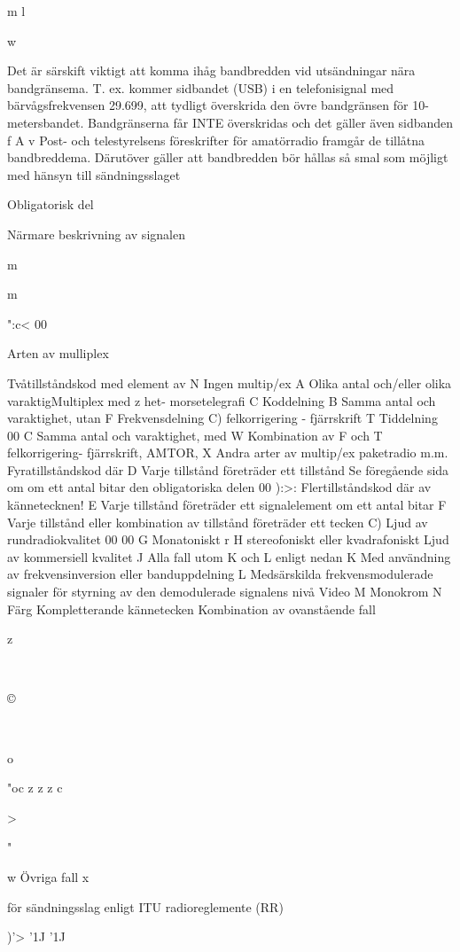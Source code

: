 m
l

w

Det är särskift viktigt att komma ihåg bandbredden vid utsändningar nära bandgränsema. T. ex.
kommer sidbandet (USB) i en telefonisignal med
bärvågsfrekvensen 29.699, att tydligt överskrida
den övre bandgränsen för 10-metersbandet. Bandgränserna får INTE överskridas och det gäller även
sidbanden f
A v Post- och telestyrelsens föreskrifter för amatörradio framgår de tillåtna bandbreddema. Därutöver gäller att bandbredden bör hållas så smal som
möjligt med hänsyn till sändningsslaget

Obligatorisk del

Närmare beskrivning av signalen

m

m

":c<
00

Arten av mulliplex

Tvåtillståndskod med element av
N Ingen multip/ex
A Olika antal och/eller olika varaktigMultiplex med
z
het- morsetelegrafi
C Koddelning
B Samma antal och varaktighet, utan
F Frekvensdelning
C)
felkorrigering - fjärrskrift
T Tiddelning
00
C Samma antal och varaktighet, med
W Kombination av F och T
felkorrigering- fjärrskrift, AMTOR,
X Andra arter av multip/ex
paketradio m.m.
Fyratillståndskod där
D Varje tillstånd företräder ett tillstånd
Se föregående sida om
om ett antal bitar
den obligatoriska delen
00
):>:
Flertillståndskod där
av kännetecknen!
E Varje tillstånd företräder ett signalelement om ett antal bitar
F Varje tillstånd eller kombination av
tillstånd företräder ett tecken
C)
Ljud av rundradiokvalitet
00
00
G Monatoniskt
r
H stereofoniskt eller kvadrafoniskt
Ljud av kommersiell kvalitet
J Alla fall utom K och L enligt nedan
K Med användning av frekvensinversion eller banduppdelning
L Medsärskilda frekvensmodulerade signaler för styrning av den demodulerade signalens nivå
Video
M Monokrom
N Färg
Kompletterande kännetecken
Kombination av ovanstående fall

z

~

©

~

o

"oc
z
z
z
c

>

"

w
Övriga fall
x

för sändningsslag enligt
ITU radioreglemente (RR)

)'>
'1J
'1J

